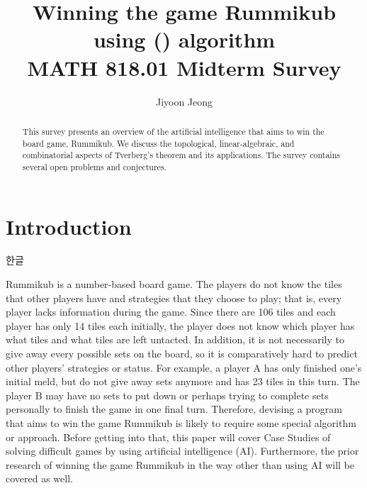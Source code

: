 \documentclass[11pt]{article}
\title{Winning the game Rummikub using () algorithm \\
	\large MATH 818.01 Midterm Survey
}
\author{Jiyoon Jeong}
\date{}
\newcommand{\rr}{\mathbb{R}}
\DeclareMathOperator{\conv}{conv}
\begin{document}
	
	\maketitle
	
	\begin{abstract}
		This survey presents an overview of the artificial intelligence that aims to win the board game, Rummikub. 
		We discuss the topological, linear-algebraic, and combinatorial aspects of Tverberg's theorem and its applications.  The survey contains several open problems and conjectures.
		
		
		
	\end{abstract}
	
	\section{Introduction}\label{section-introduction}
	
	\begin{CJK}{UTF8}{mj}
		한글 
	\end{CJK}
	
	Rummikub is a number-based board game. The players do not know the tiles that other players have and strategies that they choose to play; that is, every player lacks information during the game. Since there are 106 tiles and each player has only 14 tiles each initially, the player does not know which player has what tiles and what tiles are left untacted. In addition, it is not necessarily to give away every possible sets on the board, so it is comparatively hard to predict other players' strategies or status. For example, a player A has only finished one's initial meld, but do not give away sets anymore and has 23 tiles in this turn. The player B may have no sets to put down or perhaps trying to complete sets personally to finish the game in one final turn. Therefore, devising a program that aims to win the game Rummikub is likely to require some special algorithm or approach. Before getting into that, this paper will cover Case Studies of solving difficult games by using artificial intelligence (AI). Furthermore, the prior research of winning the game Rummikub in the way other than using AI will be covered as well.
	
	
	
\end{document}
